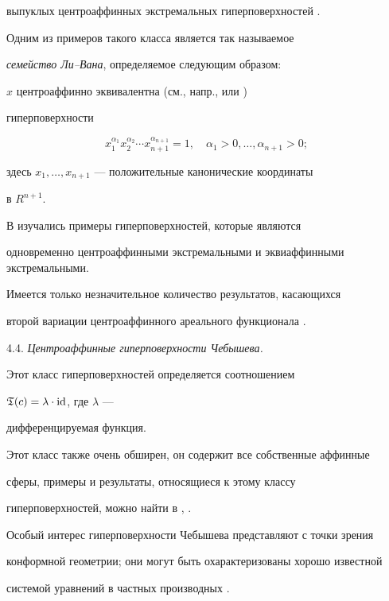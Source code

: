 выпуклых центроаффинных экстремальных гиперповерхностей \cite{LI-LI-S}.


Одним из примеров такого класса является так называемое


{\it семейство Ли--Вана}, определяемое следующим образом:


$x$ центроаффинно эквивалентна (см., напр., \cite{WANG} или \cite{LI-LI-S})


гиперповерхности


$$


x_1^{\alpha_1}x_2^{\alpha_2}\dotsb x_{n+1}^{\alpha_{n+1}}=1,


\quad \alpha_1> 0,\dotsc,\alpha_{n+1}> 0;


$$


здесь $x_1, \dotsc, x_{n+1}$ --- положительные канонические координаты


в $R^{n+1}$.





В \cite{LIU} изучались примеры гиперповерхностей, которые являются


одновременно центроаффинными экстремальными и эквиаффинными экстремальными.





Имеется только незначительное количество результатов, касающихся


второй вариации центроаффинного ареального функционала \cite{WANG}.


\medskip





4.4. {\it Центроаффинные гиперповерхности Чебышева.}


Этот класс гиперповерхностей определяется соотношением


$\frak{T} (c) = \lambda \cdot \operatorname{id}$, где $ \lambda$ ---


дифференцируемая функция.


Этот класс также очень обширен, он содержит все собственные аффинные


сферы, примеры и результаты, относящиеся к этому классу


гиперповерхностей, можно найти в \cite{LIU-W-1}, \cite{LIU-W-2}.


Особый интерес гиперповерхности Чебышева представляют с точки зрения


конформной геометрии; они могут быть охарактеризованы хорошо известной


системой уравнений в частных производных \cite{LIU-S-W}.


